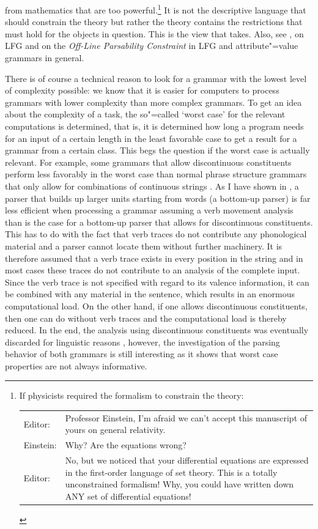from mathematics that are too powerful.\footnote{%
If physicists required the formalism to constrain the theory:\\
\begin{tabular}{@{}l@{~}p{11cm}}
Editor:   & Professor Einstein, I'm afraid we can't accept this manuscript of yours on general relativity.\\
Einstein: & Why? Are the equations wrong?\\
Editor:   & No, but we noticed that your differential equations are
    expressed in the first-order language of set theory. This is
    a totally unconstrained formalism! Why, you could have written
    down ANY set of differential equations! \citep[\page 9]{Pollard97a}
\end{tabular}
}
It is not the descriptive language that should constrain the theory but rather the theory contains the restrictions
that must hold for the objects in question. This is the view that \citet[, 280]{Chomsky81b} takes. Also, see 
,
 on LFG and  on the \emph{Off-Line Parsability Constraint}
in LFG and attribute"=value grammars in general.

There is of course a technical reason to look for a grammar with the lowest level of complexity possible:
we know that it is easier for computers to process grammars with lower complexity than more
complex grammars. To get an idea about the complexity of a task, the so"=called `worst case' for the
relevant computations is determined, that is, it is determined how long a program needs for an input
of a certain length in the least favorable case to get a result for a grammar from a certain class. This begs the question if the worst case is actually relevant. 
For example, some grammars that allow discontinuous constituents perform less favorably in the worst case than normal phrase structure grammars 
that only allow for combinations of continuous strings \citep[Section~8]{Reape91}.
As I have shown in , a parser that builds up larger units starting from words (a bottom-up parser) is far less
efficient when processing a grammar assuming a verb movement analysis than is the case for a bottom-up parser that allows for discontinuous constituents.
This has to do with the fact that verb traces do not contribute any phonological material and a parser cannot locate them without further machinery.
It is therefore assumed that a verb trace exists in every position in the string and in most cases
these traces do not contribute to an analysis of the complete input.
Since the verb trace is not specified with regard to its valence information, it can be combined
with any material in the sentence, which results in an enormous computational load.
On the other hand, if one allows discontinuous constituents, then one can do without verb traces and the computational load is thereby reduced.
In the end, the analysis using discontinuous constituents was eventually discarded for linguistic reasons \citep{Mueller2005c,Mueller2005d,MuellerLehrbuch1,MuellerGS},
however, the investigation of the parsing behavior of both grammars is still interesting as it shows that worst case properties are not always
informative.

